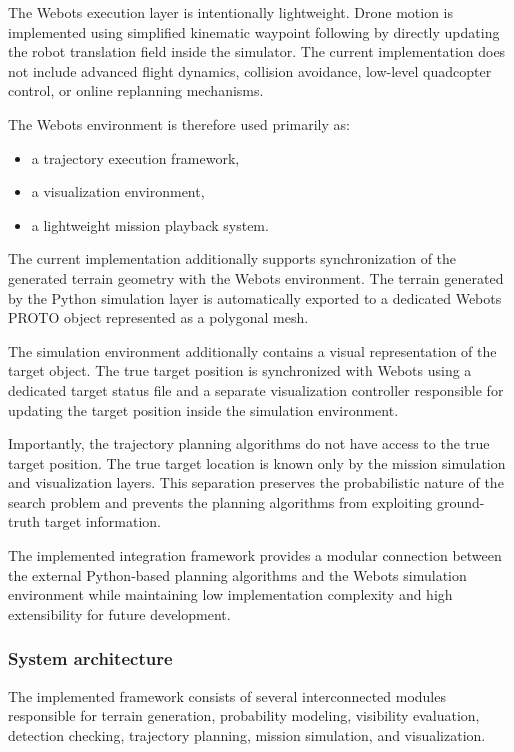 \documentclass[english]{projectreport}
\begin{document}
The Webots execution layer is intentionally lightweight. Drone motion is implemented using simplified kinematic waypoint following by directly updating the robot translation field inside the simulator. The current implementation does not include advanced flight dynamics, collision avoidance, low-level quadcopter control, or online replanning mechanisms.

The Webots environment is therefore used primarily as:
\begin{itemize}
    \item a trajectory execution framework,
    \item a visualization environment,
    \item a lightweight mission playback system.
\end{itemize}

The current implementation additionally supports synchronization of the generated terrain geometry with the Webots environment. The terrain generated by the Python simulation layer is automatically exported to a dedicated Webots PROTO object represented as a polygonal mesh.

The simulation environment additionally contains a visual representation of the target object. The true target position is synchronized with Webots using a dedicated target status file and a separate visualization controller responsible for updating the target position inside the simulation environment.

Importantly, the trajectory planning algorithms do not have access to the true target position. The true target location is known only by the mission simulation and visualization layers. This separation preserves the probabilistic nature of the search problem and prevents the planning algorithms from exploiting ground-truth target information.

The implemented integration framework provides a modular connection between the external Python-based planning algorithms and the Webots simulation environment while maintaining low implementation complexity and high extensibility for future development.

\subsubsection{System architecture}

The implemented framework consists of several interconnected modules responsible for terrain generation, probability modeling, visibility evaluation, detection checking, trajectory planning, mission simulation, and visualization.
\end{document}
